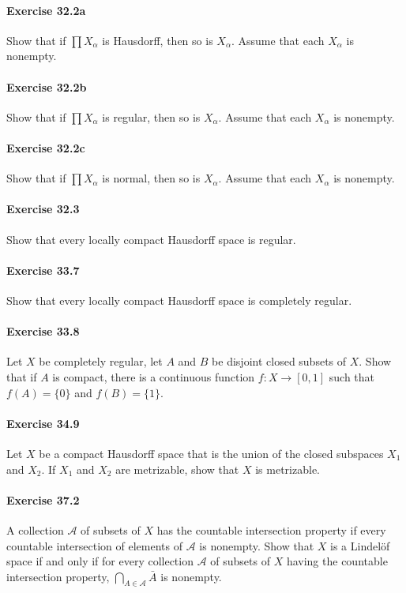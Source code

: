 \documentclass{article}
\begin{document}
\paragraph{Exercise 32.2a} Show that if $\prod X_\alpha$ is Hausdorff, then so is $X_\alpha$. Assume that each $X_\alpha$ is nonempty.

\paragraph{Exercise 32.2b} Show that if $\prod X_\alpha$ is regular, then so is $X_\alpha$. Assume that each $X_\alpha$ is nonempty.

\paragraph{Exercise 32.2c} Show that if $\prod X_\alpha$ is normal, then so is $X_\alpha$. Assume that each $X_\alpha$ is nonempty.

\paragraph{Exercise 32.3} Show that every locally compact Hausdorff space is regular.

\paragraph{Exercise 33.7} Show that every locally compact Hausdorff space is completely regular.

\paragraph{Exercise 33.8} Let $X$ be completely regular, let $A$ and $B$ be disjoint closed subsets of $X$. Show that if $A$ is compact, there is a continuous function $f \colon X \rightarrow [0, 1]$ such that $f(A) = \{0\}$ and $f(B) = \{1\}$.

\paragraph{Exercise 34.9} Let $X$ be a compact Hausdorff space that is the union of the closed subspaces $X_1$ and $X_2$. If $X_1$ and $X_2$ are metrizable, show that $X$ is metrizable.

\paragraph{Exercise 37.2} A collection $\mathcal{A}$ of subsets of $X$ has the countable intersection property if every countable intersection of elements of $\mathcal{A}$ is nonempty. Show that $X$ is a Lindelöf space if and only if for every collection $\mathcal{A}$ of subsets of $X$ having the countable intersection property, $\bigcap_{A \in \mathcal{A}} \bar{A}$ is nonempty.
\end{document}

